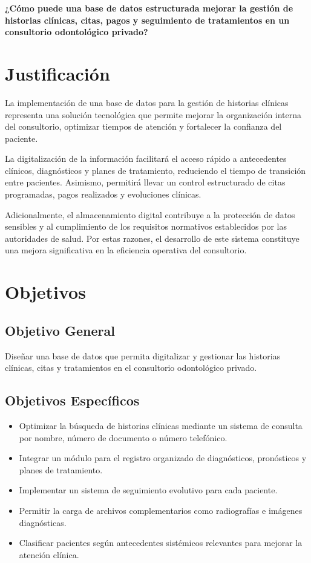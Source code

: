 \documentclass[conference]{IEEEtran}
\begin{document}
\textbf{¿Cómo puede una base de datos estructurada mejorar la gestión de historias clínicas, citas, pagos y seguimiento de tratamientos en un consultorio odontológico privado?}

\section{Justificación}

La implementación de una base de datos para la gestión de historias clínicas representa una solución tecnológica que permite mejorar la organización interna del consultorio, optimizar tiempos de atención y fortalecer la confianza del paciente.

La digitalización de la información facilitará el acceso rápido a antecedentes clínicos, diagnósticos y planes de tratamiento, reduciendo el tiempo de transición entre pacientes. Asimismo, permitirá llevar un control estructurado de citas programadas, pagos realizados y evoluciones clínicas.

Adicionalmente, el almacenamiento digital contribuye a la protección de datos sensibles y al cumplimiento de los requisitos normativos establecidos por las autoridades de salud. Por estas razones, el desarrollo de este sistema constituye una mejora significativa en la eficiencia operativa del consultorio.

\section{Objetivos}

\subsection{Objetivo General}

Diseñar una base de datos que permita digitalizar y gestionar las historias clínicas, citas y tratamientos en el consultorio odontológico privado.

\subsection{Objetivos Específicos}

\begin{itemize}
    \item Optimizar la búsqueda de historias clínicas mediante un sistema de consulta por nombre, número de documento o número telefónico.
    \item Integrar un módulo para el registro organizado de diagnósticos, pronósticos y planes de tratamiento.
    \item Implementar un sistema de seguimiento evolutivo para cada paciente.
    \item Permitir la carga de archivos complementarios como radiografías e imágenes diagnósticas.
    \item Clasificar pacientes según antecedentes sistémicos relevantes para mejorar la atención clínica.
\end{itemize}
\end{document}
